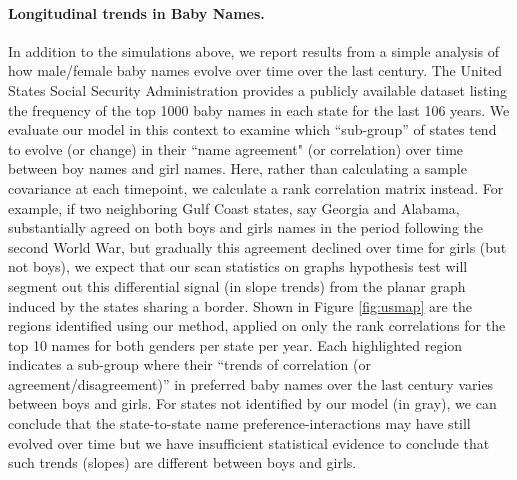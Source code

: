\paragraph{Longitudinal trends in Baby Names.} In addition to the simulations above, we report results from a simple analysis of 
how male/female baby names evolve over time over the last century. 
The United States Social Security Administration provides a publicly available dataset listing the frequency of the 
top 1000 baby names in each state for the last 106 years.
We evaluate our model in this context to examine which ``sub-group'' of states tend to evolve (or change) in their
``name agreement" (or correlation) over time between boy names and girl names.
Here, rather than calculating a sample covariance
at each timepoint, we calculate a rank correlation matrix instead. 
For example, if two neighboring Gulf Coast states, say Georgia and Alabama, substantially 
agreed on both boys and girls names in the period following the second World War, but gradually this agreement 
declined over time for girls (but not boys), 
we expect that our scan statistics on graphs hypothesis test 
will segment out this differential signal (in slope trends) from the planar graph induced by the states sharing 
a border.
Shown in Figure \ref{fig:usmap} are the regions identified using our method, applied on only the rank correlations for the top 10 names for both genders per state per year. Each highlighted region indicates a sub-group
where their ``trends of correlation (or agreement/disagreement)'' in preferred baby names over the last century 
varies between boys and girls. 
For states not identified by our model (in gray), we can conclude that
the state-to-state name preference-interactions may have still 
evolved over time but we have insufficient statistical 
evidence to conclude that such trends (slopes) are different between boys and girls. 

